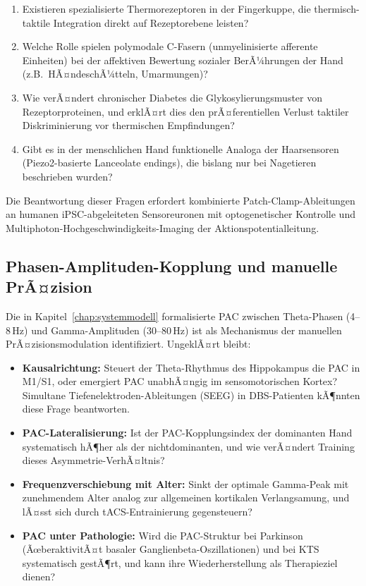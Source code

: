 ﻿\documentclass[12pt,a4paper]{report}
\theoremstyle{plain}
\theoremstyle{definition}
\theoremstyle{remark}
\begin{document}
\begin{enumerate}
\item Existieren spezialisierte Thermorezeptoren in der Fingerkuppe,
  die thermisch-taktile Integration direkt auf Rezeptorebene leisten?
\item Welche Rolle spielen polymodale C-Fasern (unmyelinisierte afferente
  Einheiten) bei der affektiven Bewertung sozialer BerÃ¼hrungen der
  Hand (z.B.\ HÃ¤ndeschÃ¼tteln, Umarmungen)?
\item Wie verÃ¤ndert chronischer Diabetes die Glykosylierungsmuster
  von Rezeptorproteinen, und erklÃ¤rt dies den prÃ¤ferentiellen Verlust
  taktiler Diskriminierung vor thermischen Empfindungen?
\item Gibt es in der menschlichen Hand funktionelle Analoga der
  Haarsensoren (Piezo2-basierte Lanceolate endings), die bislang
  nur bei Nagetieren beschrieben wurden?
\end{enumerate}

Die Beantwortung dieser Fragen erfordert kombinierte Patch-Clamp-Ableitungen
an humanen iPSC-abgeleiteten Sensoreuronen mit optogenetischer Kontrolle
und Multiphoton-Hochgeschwindigkeits-Imaging der Aktionspotentialleitung.

\subsection{Phasen-Amplituden-Kopplung und manuelle PrÃ¤zision}

Die in Kapitel~\ref{chap:systemmodell} formalisierte PAC zwischen
Theta-Phasen (4--8\,Hz) und Gamma-Amplituden (30--80\,Hz) ist als
Mechanismus der manuellen PrÃ¤zisionsmodulation identifiziert. UngeklÃ¤rt
bleibt:

\begin{itemize}
\item \textbf{Kausalrichtung:} Steuert der Theta-Rhythmus des Hippokampus
  die PAC in M1/S1, oder emergiert PAC unabhÃ¤ngig im sensomotorischen Kortex?
  Simultane Tiefenelektroden-Ableitungen (SEEG) in DBS-Patienten kÃ¶nnten
  diese Frage beantworten.
\item \textbf{PAC-Lateralisierung:} Ist der PAC-Kopplungsindex der dominanten
  Hand systematisch hÃ¶her als der nichtdominanten, und wie verÃ¤ndert
  Training dieses Asymmetrie-VerhÃ¤ltnis?
\item \textbf{Frequenzverschiebung mit Alter:} Sinkt der optimale Gamma-Peak
  mit zunehmendem Alter analog zur allgemeinen kortikalen Verlangsamung,
  und lÃ¤sst sich durch tACS-Entrainierung gegensteuern?
\item \textbf{PAC unter Pathologie:} Wird die PAC-Struktur bei Parkinson
  (ÃœberaktivitÃ¤t basaler Ganglienbeta-Oszillationen) und bei KTS
  systematisch gestÃ¶rt, und kann ihre Wiederherstellung als
  Therapieziel dienen?
\end{itemize}
\end{document}
